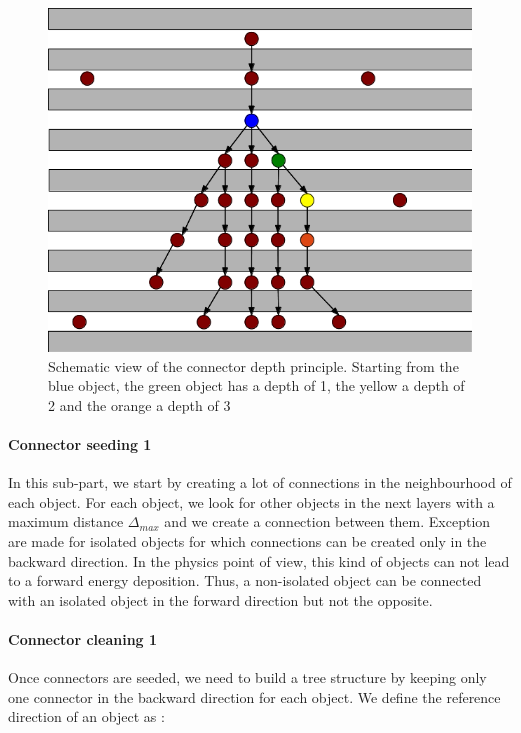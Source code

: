 \documentclass[cits]{JINST}
\begin{document}
\begin{figure}
  \vspace{-30pt}
  \begin{center}
    \includegraphics[width=\linewidth]{ArborConnectorDepth.png}
  \end{center}
  \vspace{-10pt}
  \caption{\label{ARBOR_CONNECTOR_DEPTH} Schematic view of the connector depth principle. Starting from the blue object, the green object has a depth of 1, the yellow a depth of 2 and the orange a depth of 3}
  \vspace{-30pt}
\end{figure}

\paragraph*{Connector seeding 1} In this sub-part, we start by creating a lot of connections in the neighbourhood of each object. For each object, we look for other objects in the next layers with a maximum distance $\Delta_{max}$ and we create a connection between them. Exception are made for isolated objects for which connections can be created only in the backward direction. In the physics point of view, this kind of objects can not lead to a forward energy deposition. Thus, a non-isolated object can be connected with an isolated object in the forward direction but not the opposite.


\paragraph*{Connector cleaning 1} Once connectors are seeded, we need to build a tree structure by keeping only one connector in the backward direction for each object. We define the reference direction of an object as :
\end{document}
